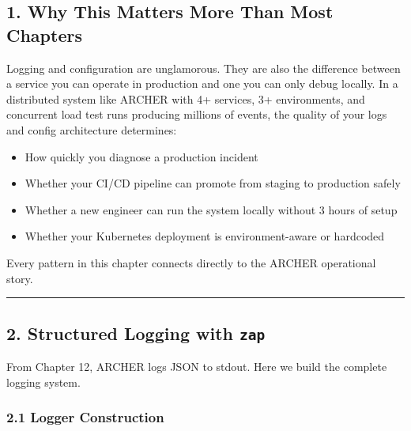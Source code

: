 \documentclass[
]{article}
\providecommand{\tightlist}{%
  \setlength{\itemsep}{0pt}\setlength{\parskip}{0pt}}
\begin{document}
\hypertarget{why-this-matters-more-than-most-chapters}{%
\subsection{1. Why This Matters More Than Most
Chapters}\label{why-this-matters-more-than-most-chapters}}

Logging and configuration are unglamorous. They are also the difference
between a service you can operate in production and one you can only
debug locally. In a distributed system like ARCHER with 4+ services, 3+
environments, and concurrent load test runs producing millions of
events, the quality of your logs and config architecture determines:

\begin{itemize}
\tightlist
\item
  How quickly you diagnose a production incident
\item
  Whether your CI/CD pipeline can promote from staging to production
  safely
\item
  Whether a new engineer can run the system locally without 3 hours of
  setup
\item
  Whether your Kubernetes deployment is environment-aware or hardcoded
\end{itemize}

Every pattern in this chapter connects directly to the ARCHER
operational story.

\begin{center}\rule{0.5\linewidth}{0.5pt}\end{center}

\hypertarget{structured-logging-with-zap}{%
\subsection{\texorpdfstring{2. Structured Logging with
\texttt{zap}}{2. Structured Logging with zap}}\label{structured-logging-with-zap}}

From Chapter 12, ARCHER logs JSON to stdout. Here we build the complete
logging system.

\hypertarget{logger-construction}{%
\subsubsection{2.1 Logger Construction}\label{logger-construction}}
\end{document}
